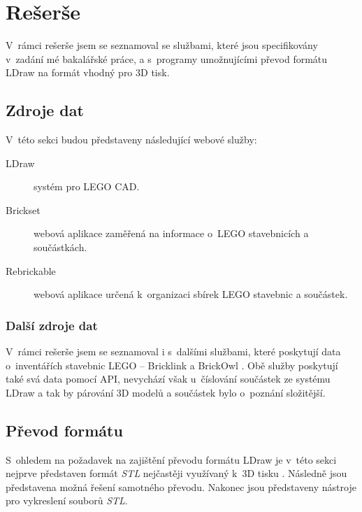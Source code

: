 \chapter{Rešerše}
V~rámci rešerše jsem se seznamoval se službami, které jsou specifikovány v~zadání mé bakalářské práce, a s~programy umožnujícími převod formátu LDraw na formát vhodný pro 3D tisk.


\section{Zdroje dat}  

V~této sekci budou představeny následující webové služby:
\begin{description}
  \item[LDraw] systém pro LEGO \gls{CAD}.
  \item[Brickset] webová aplikace zaměřená na informace o~LEGO stavebnicích a součástkách.
  \item[Rebrickable] webová aplikace určená k~organizaci sbírek LEGO stavebnic a součástek.
\end{description}




\subsection{Další zdroje dat}
V~rámci rešerše jsem se seznamoval i s~dalšími službami, které poskytují data o~inventářích stavebnic LEGO – Bricklink \autocite{bricklink} a BrickOwl \autocite{brickowl}. Obě služby poskytují také svá data pomocí \gls{API}, nevychází však u~číslování součástek ze systému LDraw a tak by párování 3D modelů a součástek bylo o~poznání složitější. 

\section{Převod formátu}
S~ohledem na požadavek na zajištění převodu formátu LDraw je v~této sekci nejprve představen formát \textit{\gls{STL}} nejčastěji využívaný k~3D tisku \autocite{3DAddFab}. Následně jsou představena možná řešení samotného převodu. Nakonec jsou představeny nástroje pro vykreslení souborů \textit{STL}.






